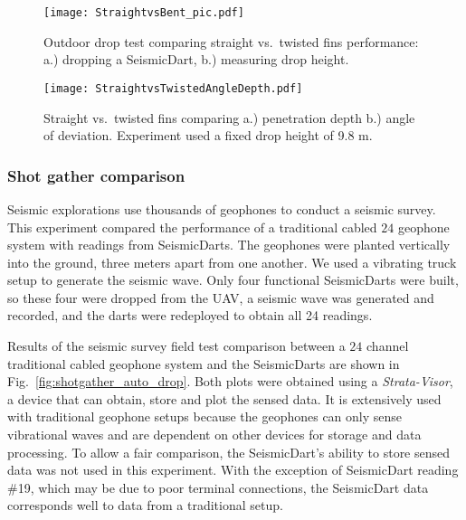 \begin{figure} \centering
  {\texttt{[image: StraightvsBent\_pic.pdf]}}
 \caption{Outdoor drop test comparing straight vs.\ twisted fins performance:
 a.)  dropping a SeismicDart,  
 b.)  measuring drop height.} 
 \label{fig:StraightBentPic}
 \vspace{-1em}
\end{figure}
\begin{figure} \centering
  {\texttt{[image: StraightvsTwistedAngleDepth.pdf]}}
 \caption{\label{fig:StraightBentDepth}Straight vs.\ twisted fins comparing a.) penetration depth b.) angle of deviation. Experiment used a fixed drop height of 9.8 m.} 
\end{figure}

\subsubsection{Shot gather comparison} 
Seismic explorations use thousands of geophones to conduct a seismic survey. 
This experiment compared the performance of a traditional cabled $24$ geophone system with readings from SeismicDarts.
The geophones were planted vertically into the ground, three meters apart from one another.  
We used a vibrating truck setup to generate the seismic wave. 
Only four functional SeismicDarts were built, so these four were dropped from the UAV, a seismic wave was generated and recorded, and the darts were redeployed to obtain all 24 readings.

Results of the seismic survey field test comparison between a $24$ channel traditional cabled geophone system and the SeismicDarts are shown in Fig.~\ref{fig:shotgather_auto_drop}.   
Both plots were obtained using a \emph{Strata-Visor}, a device that can obtain, store and plot the sensed data. 
It is extensively used with traditional geophone setups because the geophones can only sense vibrational waves and are dependent on other devices for storage and data processing. 
To allow a fair comparison, the SeismicDart's  ability to store sensed data was not used in this experiment. 
With the exception of SeismicDart reading \#19, which may be due to poor terminal connections, the SeismicDart data corresponds well to data from a traditional setup.


